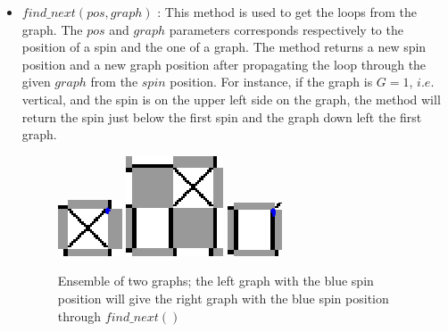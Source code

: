 \documentclass[a4paper,12pt,twoside]{article}
\begin{document}
\begin{itemize}[label=$\star$]
\begin{figure}[!h]
			\label{tileandgraph}
		\end{figure}
		\item $find\_next(pos, graph)$ : This method is used to get the loops from the graph. The $pos$ and $graph$ parameters corresponds respectively to the position of a spin and the one of a graph. The method returns a new spin position and a new graph position after propagating the loop through the given $graph$ from the $spin$ position. For instance, if the graph is $G = 1$, $i.e.$ vertical, and the spin is on the upper left side on the graph, the method will return the spin just below the first spin and the graph down left the first graph. 
		\begin{figure}[!h]
			\centering
			\includegraphics[]{firstgraph.png}
			\includegraphics[]{twograph.png}
			\includegraphics[]{secondgraph.png}
			\caption{Ensemble of two graphs; the left graph with the blue spin position will give the right graph with the blue spin position through $find\_next()$}
			

\end{figure}
\end{itemize}
\end{document}
